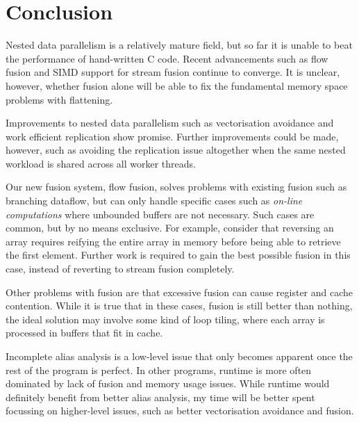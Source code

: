 \section{Conclusion}

Nested data parallelism is a relatively mature field, but so far it is unable to beat the performance of hand-written C code.
Recent advancements such as flow fusion\cite{lippmeier2013flow} and SIMD support for stream fusion\cite{mainland2013haskell}
continue to converge.
It is unclear, however, whether fusion alone will be able to fix the fundamental memory space problems with flattening\cite{lippmeier2012work}.

Improvements to nested data parallelism such as vectorisation avoidance\cite{keller2012vectorisation}
and work efficient replication\cite{lippmeier2012work} show promise.
Further improvements could be made, however, such as avoiding the replication issue altogether when the same nested workload is shared across all worker threads.

Our new fusion system, flow fusion\cite{lippmeier2013flow}, solves problems with existing fusion such as branching dataflow,
but can only handle specific cases such as \emph{on-line computations} where unbounded buffers are not necessary.
Such cases are common, but by no means exclusive.
For example, consider that reversing an array requires reifying the entire array in memory before being able to retrieve the first element.
Further work is required to gain the best possible fusion in this case, instead of reverting to stream fusion completely.

Other problems with fusion are that excessive fusion can cause register and cache contention\cite{song2004improving}.
While it is true that in these cases, fusion is still better than nothing,
the ideal solution may involve some kind of loop tiling\cite{pike2002better},
where each array is processed in buffers that fit in cache.

Incomplete alias analysis is a low-level issue that only becomes apparent once the rest of the program is perfect.
In other programs, runtime is more often dominated by lack of fusion and memory usage issues.
While runtime would definitely benefit from better alias analysis, my time will be better spent focussing on higher-level issues,
such as better vectorisation avoidance and fusion.


